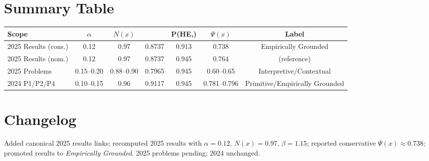 \documentclass[11pt]{article}
\newcommand{\Nx}{N(x)}
\newcommand{\Px}{\Psi(x)}
\newcommand{\post}{P(H\mid E,\beta)}
\newcommand{\pen}{\mathrm{Penalty}}
\begin{document}
\section{Summary Table}
\begin{center}
\renewcommand{\arraystretch}{1.12}
\begin{tabular}{@{}lcccccc@{}}
\toprule
Scope & $\alpha$ & $\Nx$ & \pen & \post & $\Px$ & Label\\
\midrule
2025 Results (cons.) & 0.12 & 0.97 & 0.8737 & 0.913 & 0.738 & Empirically Grounded\\
2025 Results (nom.)  & 0.12 & 0.97 & 0.8737 & 0.945 & 0.764 & (reference)\\
2025 Problems        & 0.15--0.20 & 0.88--0.90 & 0.7965 & 0.945 & 0.60--0.65 & Interpretive/Contextual\\
2024 P1/P2/P4        & 0.10--0.15 & 0.96 & 0.9117 & 0.945 & 0.781--0.796 & Primitive/Empirically Grounded\\
\bottomrule
\end{tabular}
\end{center}

\section*{Changelog}
Added canonical 2025 results links; recomputed 2025 results with $\alpha=0.12$, $\Nx=0.97$, $\beta=1.15$; reported conservative $\Px\approx 0.738$; promoted results to \emph{Empirically Grounded}. 2025 problems pending; 2024 unchanged.
\end{document}

